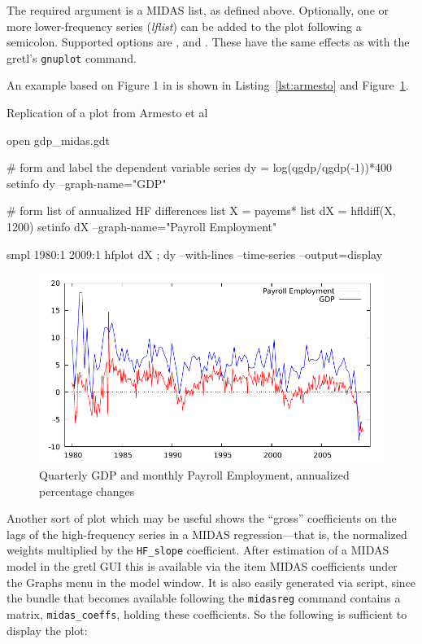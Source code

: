 \documentclass{article}
\begin{document}
The required argument is a MIDAS list, as defined above. Optionally,
one or more lower-frequency series (\textsl{lflist}) can be added to
the plot following a semicolon. Supported options are
,  and . These
have the same effects as with the gretl's \texttt{gnuplot} command.

An example based on Figure 1 in \cite{armesto10} is shown in
Listing~\ref{lst:armesto} and Figure~\ref{fig:armesto}.

\begin{script}[p]
  \caption{Replication of a plot from Armesto et al}
  \label{lst:armesto}
\begin{scode}
open gdp_midas.gdt

# form and label the dependent variable
series dy = log(qgdp/qgdp(-1))*400
setinfo dy --graph-name="GDP"

# form list of annualized HF differences
list X = payems*
list dX = hfldiff(X, 1200)
setinfo dX --graph-name="Payroll Employment"

smpl 1980:1 2009:1
hfplot dX ; dy --with-lines --time-series --output=display
\end{scode}
\end{script}

\begin{figure}[p]
  \centering
  \includegraphics{figures/armesto_plot}
  \caption{Quarterly GDP and monthly Payroll Employment,
  annualized percentage changes}
  \label{fig:armesto}
\end{figure}

Another sort of plot which may be useful shows the ``gross''
coefficients on the lags of the high-frequency series in a MIDAS
regression---that is, the normalized weights multiplied by the
\texttt{HF\_slope} coefficient. After estimation of a MIDAS model in
the gretl GUI this is available via the item \textsf{MIDAS
  coefficients} under the \textsf{Graphs} menu in the model window. It
is also easily generated via script, since the  bundle
that becomes available following the \texttt{midasreg} command
contains a matrix, \texttt{midas\_coeffs}, holding these
coefficients. So the following is sufficient to display the plot:
%
\end{document}
